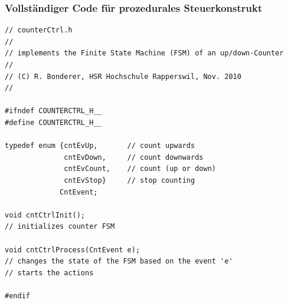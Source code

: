 \subsubsection{Vollständiger Code für prozedurales Steuerkonstrukt}
\begin{lstlisting}[style=C]
// counterCtrl.h
//
// implements the Finite State Machine (FSM) of an up/down-Counter
//
// (C) R. Bonderer, HSR Hochschule Rapperswil, Nov. 2010
//

#ifndef COUNTERCTRL_H__
#define COUNTERCTRL_H__

typedef enum {cntEvUp,       // count upwards
              cntEvDown,     // count downwards
              cntEvCount,    // count (up or down)
              cntEvStop}     // stop counting
             CntEvent;

void cntCtrlInit();
// initializes counter FSM

void cntCtrlProcess(CntEvent e);
// changes the state of the FSM based on the event 'e'
// starts the actions

#endif
\end{lstlisting}
